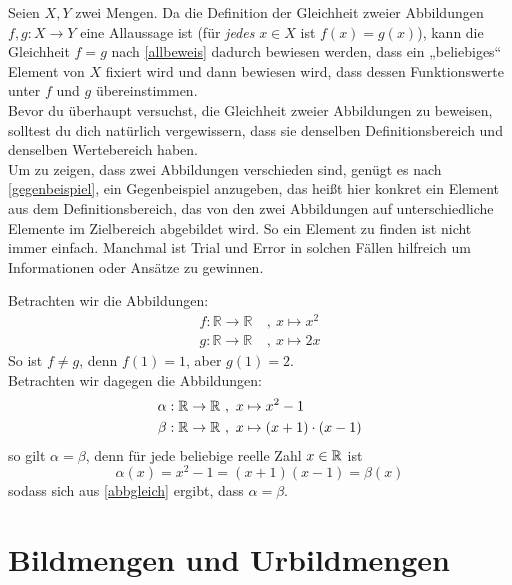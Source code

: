 \begin{bem}
Seien $X,Y$ zwei Mengen. Da die Definition der Gleichheit zweier Abbildungen $f,g:X\to Y$ eine Allaussage ist (für \emph{jedes} $x\in X$ ist $f(x)=g(x)$), kann die Gleichheit $f=g$ nach \cref{allbeweis} dadurch bewiesen werden, dass ein „beliebiges“ Element von $X$ fixiert wird und dann bewiesen wird, dass dessen Funktionswerte unter $f$ und $g$ übereinstimmen. \\
Bevor du überhaupt versuchst, die Gleichheit zweier Abbildungen zu beweisen, solltest du dich natürlich vergewissern, dass sie denselben Definitionsbereich und denselben Wertebereich haben. \\[0.5em]
	Um zu zeigen, dass zwei Abbildungen verschieden sind, genügt es nach \cref{gegenbeispiel}, ein Gegenbeispiel anzugeben, das heißt hier konkret ein Element aus dem Definitionsbereich, das von den zwei Abbildungen auf unterschiedliche Elemente im Zielbereich abgebildet wird. So ein Element zu finden ist nicht immer einfach. Manchmal ist Trial und Error in solchen Fällen hilfreich um Informationen oder Ansätze zu gewinnen.
\end{bem}


\begin{bsp}
	Betrachten wir die Abbildungen: 
	\begin{align*}
		f: \mathbb{R} \to \mathbb{R}\ &,\ x \mapsto x^2 \\
		g: \mathbb{R} \to \mathbb{R}\ &,\ x \mapsto 2x
	\end{align*}
	So ist $f \neq g$, denn $f(1)=1$, aber $g(1)=2$.\\
	Betrachten wir dagegen die Abbildungen:
	\begin{align*}
		\alpha: {\mathbb R} \to \mathbb{R}\ &,\ x \mapsto  x^2-1 \\
		\beta: {\mathbb R} \to \mathbb{R}\ &,\ x \mapsto (x+1)\cdot (x-1)
	\end{align*}
	so gilt $\alpha=\beta$, denn für jede beliebige reelle Zahl $x\in {\mathbb R}$ ist
	\[ \alpha(x) = x^2-1 = (x+1)(x-1) = \beta(x) \]
	sodass sich aus \cref{abbgleich} ergibt, dass $\alpha=\beta$.
\end{bsp}




\section{Bildmengen und Urbildmengen}

